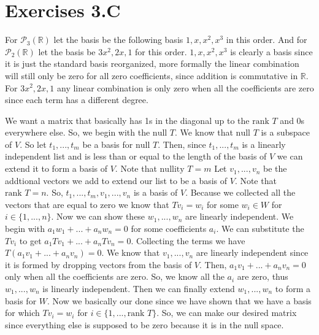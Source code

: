 \documentclass[10pt, twocolumn]{article}
\newcommand{\R}{\mathbb{R}}
\newcommand{\poly}[2]{\mathcal{P}_{#1}\left(#2\right)}
\newcommand{\nul}{\text{null }}
\newcommand{\nullity}{\text{nullity }}
\newcommand{\rank}{\text{rank }}
\begin{document}
\begin{q}[26]
    
\end{q}

\section{Exercises 3.C}
\begin{q}[2]
    For $ \poly{3}{\R} $ let the basis be the following basis $ 1, x, x^2, x^3 $ in this order. 
    And for $ \poly{2}{\R} $ let the basis be $ 3x^2, 2x, 1 $ for this order. 
    $ 1, x, x^2, x^3 $ is clearly a basis since it is just the standard basis reorganized, more formally the linear combination will still only be zero for all zero coefficients, since addition is commutative in $ \R $. 
    For  $ 3x^2, 2x, 1 $ any linear combination is only zero when all the coefficients are zero since each term has a different degree. 
\end{q}
\begin{q}[3]
    We want a matrix that basically has 1s in the diagonal up to the $ \rank T $ and 0s everywhere else. 
    So, we begin with the $ \nul T $. 
    We know that $ \nul T $ is a subspace of $ V $. 
    So let $ t_1, ..., t_m $ be a basis for $ \nul T $. 
    Then, since $ t_1, ..., t_m $ is a linearly independent list and is less than or equal to the length of the basis of $ V $ we can extend it to form a basis of $ V $.
    Note that $ \nullity T = m $
    Let $ v_1, ..., v_n $ be the addtional vectors we add to extend our list to be a basis of $ V $. 
    Note that $ \rank T = n $. 
    So, $ t_1, ..., t_m , v_1, ..., v_n $ is a basis of $ V $. 
    Because we collected all the vectors that are equal to zero we know that $ Tv_i = w_i $ for some $ w_i \in W $ for $ i \in \{1, ..., n\} $. 
    Now we can show these $ w_1, ..., w_n $ are linearly independent. 
    We begin with $ a_1w_1 + ... + a_n w_n = 0 $ for some coefficients $ a_i $. 
    We can substitute the $ Tv_i $ to get $ a_1Tv_1 + ... + a_n Tv_n = 0 $. 
    Collecting the terms we have $ T(a_1v_1 + ... + a_n v_n) = 0 $. 
    We know that $ v_1, ..., v_n $ are linearly independent since it is formed by dropping vectors from the basis of $ V $. 
    Then, $ a_1 v_1 + ... + a_n v_n = 0 $ only when all the coefficients are zero.
    So, we know all the $ a_i $ are zero, thus $ w_1, ..., w_n $ is linearly independent. 
    Then we can finally extend $ w_1, ..., w_n $ to form a basis for $ W $. 
    Now we basically our done since we have shown that we have a basis for which $ Tv_i = w_i $ for $ i \in \{1, ..., \rank T\} $. 
    So, we can make our desired matrix since everything else is supposed to be zero because it is in the null space. 
\end{q}
\begin{q}
     
\end{q}
\end{document}
